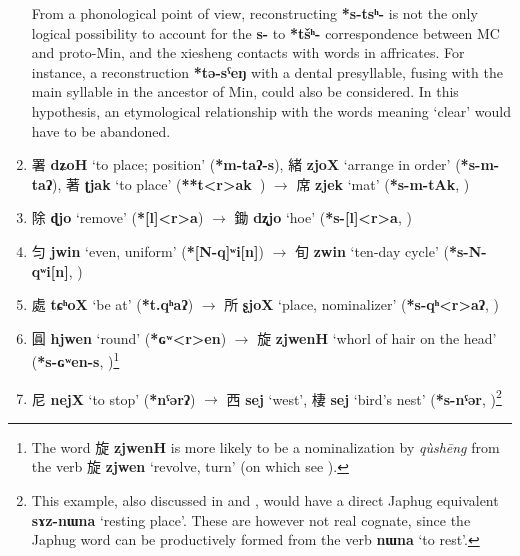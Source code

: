 \documentclass[oneside,a4paper,11pt]{article}
\newcommand{\ipa}[1]{\textbf{{\phon\mbox{#1}}}} %
\newcommand{\zh}[1]{{\cn #1}}
\newcommand{\zhc}[2]{\zh{#1} \ipa{#2}}
\begin{document}
\begin{enumerate}
{From a phonological point of view, reconstructing \ipa{*s-tsʰ-} is not the only logical possibility to account for the \ipa{s-} to \ipa{*tšʰ-} correspondence between MC and proto-Min, and the xiesheng contacts with words in affricates. For instance, a reconstruction \ipa{*tə-sˁeŋ} with a dental presyllable, fusing with the main syllable in the ancestor of Min, could also be considered. In this hypothesis, an etymological relationship with the words meaning `clear' would have to be abandoned.
} 
\item \zhc{署}{dʑoH} ‘to place; position’ (\ipa{*m-taʔ-s}),  \zhc{緒}{zjoX} ‘arrange in order’ (\ipa{*s-m-taʔ}),  \zhc{著}{ʈjak} ‘to place’ (\ipa{**t<r>ak }) $\rightarrow$  \zhc{席}{zjek} `mat’ (\ipa{*s-m-tAk},  \citealt[61]{bs14oc})
\item \zhc{除}{ɖjo} ‘remove’ (\ipa{*[l]<r>a}) $\rightarrow$ \zhc{鋤}{dʐjo} ‘hoe’ (\ipa{*s-[l]<r>a}, \citealt[81]{bs14oc})
\item \zhc{匀}{jwin} ‘even, uniform’ (\ipa{*[N-q]ʷi[n]}) $\rightarrow$ \zhc{旬}{zwin} ‘ten-day cycle’ (\ipa{*s-N-qʷi[n]}, \citealt[127]{bs14oc})
\item \zhc{處}{tɕʰoX} ‘be at’ (\ipa{*t.qʰaʔ}) $\rightarrow$ \zhc{所}{ʂjoX} ‘place, nominalizer’ (\ipa{*s-qʰ<r>aʔ}, \citealt[130]{bs14oc})
\item \zhc{圓}{hjwen} ‘round’ (\ipa{*ɢʷ<r>en}) $\rightarrow$ \zhc{旋}{zjwenH} ‘whorl of hair on the head’ (\ipa{*s-ɢʷen-s}, \citealt[141]{bs14oc})\footnote{The word \zhc{旋}{zjwenH} is more likely to be a nominalization by \textit{qùshēng} from the verb \zhc{旋}{zjwen} `revolve, turn' (on which see \citealt{downer59, jacques16ssuffixes}). }
\item \zhc{尼}{nejX} ‘to stop’ (\ipa{*nˤərʔ}) $\rightarrow$ \zhc{西}{sej} ‘west’, \zhc{棲}{sej} ‘bird’s nest’  (\ipa{*s-nˤər}, \citealt[147]{bs14oc})\footnote{This example, also discussed in \citet{sagart04directions} and \citet{nohara18sner}, would have a direct Japhug equivalent \ipa{sɤz-nɯna} `resting place'. These are however not real cognate, since the Japhug word can be productively formed from the verb  \ipa{nɯna} `to rest'.}
\end{enumerate}
 
\end{document}
